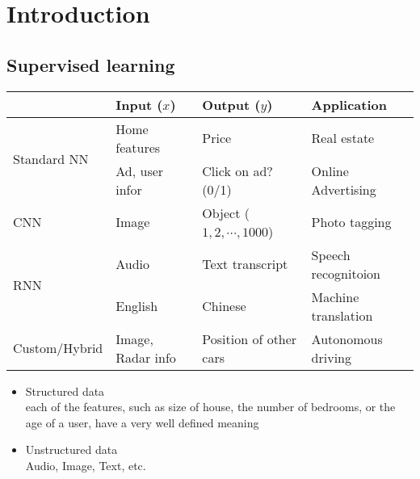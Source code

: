 




\pagestyle{scrheadings}
\clearscrheadfoot

\cfoot{\pagemark}



\section{Introduction}
\label{sec:introduction}	
%
\subsection{Supervised learning}
\begin{center}
\begin{tabular}{| m{3cm} || m{4cm} | m{4cm} | m{4cm} | }
\hline
{}&Input ($x$) & Output ($y$) & Application\\
\hline
\hline
\multirow{2}{*}{Standard NN} & Home features & Price & Real estate\\ \cline{2-4}
&Ad, user infor & Click on ad? (0/1) & Online Advertising\\
\hline
CNN  &Image & Object ($1, 2, \cdots, 1000$) & Photo tagging\\
\hline
\multirow{2}{*}{RNN} & Audio & Text transcript & Speech recognitoion\\ \cline{2-4}
&English & Chinese & Machine translation\\
\hline
Custom/Hybrid & Image, Radar info & Position of other cars & Autonomous driving\\
\hline
\end{tabular}
\end{center}

\begin{itemize}
\item
Structured data\\
each of the features, such as size of house, the number of bedrooms, or the age of a user, have a very well defined meaning
\item
Unstructured data\\
Audio, Image, Text, etc.
\end{itemize}

